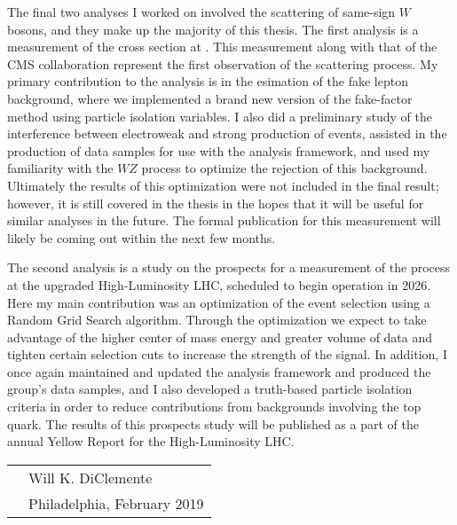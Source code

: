 The final two analyses I worked on involved the scattering of same-sign $W$ bosons, and they make up the majority of this thesis.
The first analysis is a measurement of the \ssww cross section at .
This measurement along with that of the CMS collaboration represent the first observation of the \ssww scattering process.
My primary contribution to the analysis is in the esimation of the fake lepton background, where we implemented a brand new version of the fake-factor method using particle isolation variables.
I also did a preliminary study of the interference between electroweak and strong production of \ssww events, assisted in the production of data samples for use with the analysis framework, and used my familiarity with the $WZ$ process to optimize the rejection of this background.
Ultimately the results of this optimization were not included in the final result; however, it is still covered in the thesis in the hopes that it will be useful for similar analyses in the future.
The formal publication for this measurement will likely be coming out within the next few months.

The second \ssww analysis is a study on the prospects for a measurement of the process at the upgraded High-Luminosity LHC, scheduled to begin operation in 2026.
Here my main contribution was an optimization of the event selection using a Random Grid Search algorithm.
Through the optimization we expect to take advantage of the higher center of mass energy and greater volume of data and tighten certain selection cuts to increase the strength of the \ssww signal.
In addition, I once again maintained and updated the analysis framework and produced the group's data samples, and I also developed a truth-based particle isolation criteria in order to reduce contributions from backgrounds involving the top quark.
The results of this prospects study will be published as a part of the annual Yellow Report for the High-Luminosity LHC.



\vspace{0.05\textheight}

\begin{tabular}{p{} l}
  & Will K. DiClemente           \\
  & Philadelphia, February 2019  \\
\end{tabular}


